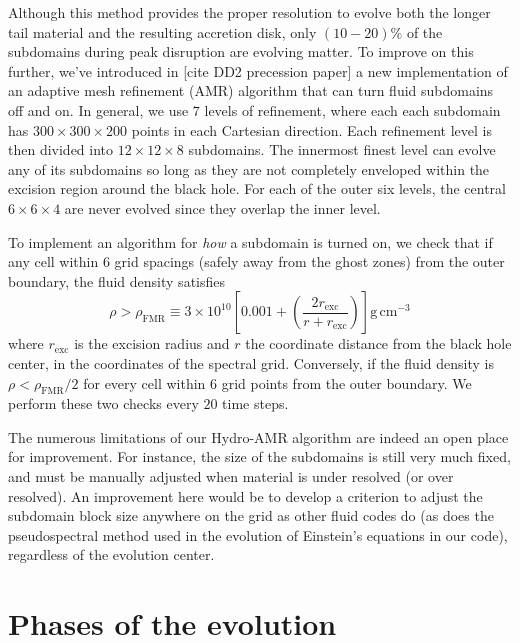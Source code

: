Although this method provides the proper resolution to evolve both the longer tail material and the resulting accretion disk, only $\left(10 - 20\right) \%$ of the subdomains during peak disruption are evolving matter.  
To improve on this further, we've introduced in [cite DD2 precession paper] a new implementation of an adaptive mesh refinement (AMR) algorithm that can turn  fluid subdomains off and on.
In general, we use $7$ levels of refinement, where each each subdomain has $300 \times 300 \times 200$ points in each Cartesian direction.
Each refinement level is then divided into $12 \times 12 \times 8$ subdomains.
The innermost finest level can evolve any of its subdomains so long as they are not completely enveloped within the excision region around the black hole.
For each of the outer six levels, the central $6 \times 6 \times 4$ are never evolved since they overlap the inner level.

To implement an algorithm for \textit{how} a subdomain is turned on, we check that if any cell within $6$ grid spacings (safely away from the ghost zones) from the outer boundary, the fluid density satisfies 
\begin{equation}
\rho > \rho_\textrm{FMR} 
	\equiv 3 \times 10^{10}\left[0.001 
	+ \left( \frac{2 r_\textrm{exc}}{r+r_\textrm{exc}} \right)
	\right] \textrm{g}\,\textrm{cm}^{-3}
\end{equation}
where $r_\textrm{exc}$ is the excision radius and $r$ the coordinate distance from the black hole center, in the coordinates of the spectral grid.
Conversely, if the fluid density is $\rho < \rho_\textrm{FMR} / 2$ for every cell within $6$ grid points from the outer boundary.
We perform these two checks every $20$ time steps.

The numerous limitations of our Hydro-AMR algorithm are indeed an open place for improvement.  For instance, the size of the subdomains is still very much fixed, and must be manually adjusted when material is under resolved (or over resolved).  An improvement here would be to develop a criterion to adjust the subdomain block size anywhere on the grid as other fluid codes do (as does the pseudospectral method used in the evolution of Einstein's equations in our code), regardless of the evolution center.  

\section{Phases of the evolution}
\label{sec:epochs}


